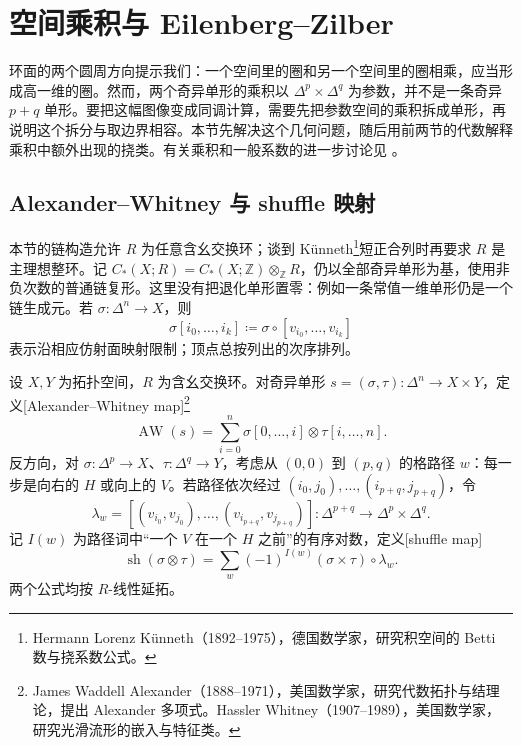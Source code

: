 
% 
% 

\section{空间乘积与 Eilenberg–Zilber}
\label{g2:sec:0403}

环面的两个圆周方向提示我们：一个空间里的圈和另一个空间里的圈相乘，应当形成高一维的圈。然而，两个奇异单形的乘积以 \(\Delta^p\times\Delta^q\) 为参数，并不是一条奇异 \(p+q\) 单形。要把这幅图像变成同调计算，需要先把参数空间的乘积拆成单形，再说明这个拆分与取边界相容。本节先解决这个几何问题，随后用前两节的代数解释乘积中额外出现的挠类。有关乘积和一般系数的进一步讨论见 \cite[第3.B节]{Hatcher2002}。

\subsection{Alexander–Whitney 与 shuffle 映射}
\label{g2:subsec:0403:01}

本节的链构造允许 \(R\) 为任意含幺交换环；谈到 Künneth\footnote{Hermann Lorenz Künneth（1892--1975），德国数学家，研究积空间的 Betti 数与挠系数公式。}短正合列时再要求 \(R\) 是主理想整环。记 \(C_*(X;R)=C_*(X;\mathbb Z)\otimes_{\mathbb Z}R\)，仍以全部奇异单形为基，使用非负次数的普通链复形。这里没有把退化单形置零：例如一条常值一维单形仍是一个链生成元。若 \(\sigma:\Delta^n\to X\)，则
\[
	\sigma[i_0,\ldots,i_k]\coloneqq
	\sigma\circ[v_{i_0},\ldots,v_{i_k}]
\]
表示沿相应仿射面映射限制；顶点总按列出的次序排列。

\begin{definition}\label{g2:def:aw-shuffle}
	设 \(X,Y\) 为拓扑空间，\(R\) 为含幺交换环。对奇异单形 \(s=(\sigma,\tau):\Delta^n\to X\times Y\)，定义[Alexander--Whitney map]\footnote{James Waddell Alexander（1888--1971），美国数学家，研究代数拓扑与结理论，提出 Alexander 多项式。Hassler Whitney（1907--1989），美国数学家，研究光滑流形的嵌入与特征类。}
	\begin{equation}\label{g2:eq:aw-map}
		\operatorname{AW}(s)
		=\sum_{i=0}^n\sigma[0,\ldots,i]\otimes\tau[i,\ldots,n].
	\end{equation}
	反方向，对 \(\sigma:\Delta^p\to X\)、\(\tau:\Delta^q\to Y\)，考虑从 \((0,0)\) 到 \((p,q)\) 的格路径 \(w\)：每一步是向右的 \(H\) 或向上的 \(V\)。若路径依次经过 \((i_0,j_0),\ldots,(i_{p+q},j_{p+q})\)，令
	\[
		\lambda_w=[(v_{i_0},v_{j_0}),\ldots,(v_{i_{p+q}},v_{j_{p+q}})]
		:\Delta^{p+q}\longrightarrow\Delta^p\times\Delta^q.
	\]
	记 \(I(w)\) 为路径词中“一个 \(V\) 在一个 \(H\) 之前”的有序对数，定义[shuffle map]
	\begin{equation}\label{g2:eq:shuffle-map}
		\operatorname{sh}(\sigma\otimes\tau)
		=\sum_w(-1)^{I(w)}(\sigma\times\tau)\circ\lambda_w.
	\end{equation}
	两个公式均按 \(R\)-线性延拓。
\end{definition}

